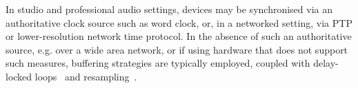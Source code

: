In studio and professional audio settings, devices may be synchronised via an
authoritative clock source such as word clock, or, in a networked setting,
via PTP or lower-resolution network time protocol.
In the absence of such an authoritative source, e.g. over a wide area network,
or if using hardware that does not support such measures, buffering strategies
are typically employed, coupled with delay-locked
loops~\citep{adriaensen_using_2005} and
resampling~\citep{adriaensen_controlling_2012}.
